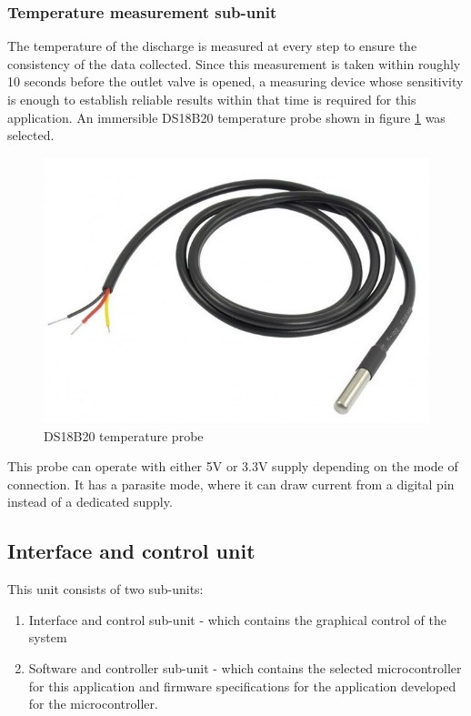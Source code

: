 
\subsubsection{Temperature measurement sub-unit}
 The temperature of the discharge is measured at every step to ensure the consistency of the data collected. Since this measurement is taken within roughly 10 seconds before the outlet valve is opened, a measuring device whose sensitivity is enough to establish reliable results within that time is required for this application. An immersible DS18B20 temperature probe shown in figure \ref{fig:ds18b20_temperature} was selected. 
 \begin{figure}[H]
    \centering
    \includegraphics[width=.28\textwidth, height=.28\textheight]{Figures/ds18b20_temperature_probe.jpg}
    \caption[DS18B20 temperature probe]{DS18B20 temperature probe \cite{ds18b20}}
    \label{fig:ds18b20_temperature}
\end{figure}

 This probe can operate with either 5V or 3.3V supply depending on the mode of connection. It has a parasite mode, where it can draw current from a digital pin instead of a dedicated supply. 
 
\subsection{Interface and control unit}

This unit consists of two sub-units:
\begin{enumerate}
    \item Interface and control sub-unit - which contains the graphical control of the system
    \item Software and controller sub-unit  - which contains the selected microcontroller for this application and firmware specifications for the application developed for the microcontroller.
\end{enumerate}

